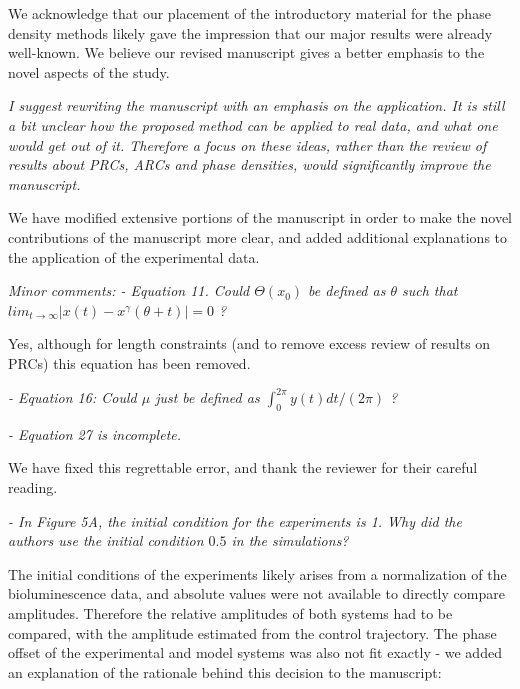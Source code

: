 \documentclass[11pt, letterpaper]{article}
\newenvironment{reviewer}{\itshape\color{gray}}{}
\begin{document}
We acknowledge that our placement of the introductory material for the phase density methods likely gave the impression that our major results were already well-known.
We believe our revised manuscript gives a better emphasis to the novel aspects of the study.

\begin{reviewer}
I suggest rewriting the manuscript with an emphasis on the application.
It is still a bit unclear how the proposed method can be applied to real data, and what one would get out of it.
Therefore a focus on these ideas, rather than the review of results about PRCs, ARCs and phase densities, would significantly improve the manuscript.
\end{reviewer}
 
We have modified extensive portions of the manuscript in order to make the novel contributions of the manuscript more clear, and added additional explanations to the application of the experimental data.

\begin{reviewer}
Minor comments: 
- Equation 11. Could $\Theta(x_0)$ be defined as $\theta$ such that $lim_{t\rightarrow \infty} | x(t)-x^\gamma(\theta+t)|=0$ ?
\end{reviewer}

Yes, although for length constraints (and to remove excess review of results on PRCs) this equation has been removed.

\begin{reviewer}
- Equation 16: Could $\mu$ just be defined as $\int_0^{2\pi} y(t)dt/(2\pi)$ ?
\end{reviewer}

\begin{reviewer}
- Equation 27 is incomplete. 
\end{reviewer}
 
We have fixed this regrettable error, and thank the reviewer for their careful reading.

\begin{reviewer}
- In Figure 5A, the initial condition for the experiments is 1. Why did the authors use the initial condition $0.5$ in the simulations?
\end{reviewer}

The initial conditions of the experiments likely arises from a normalization of the bioluminescence data, and absolute values were not available to directly compare amplitudes.
Therefore the relative amplitudes of both systems had to be compared, with the amplitude estimated from the control trajectory.
The phase offset of the experimental and model systems was also not fit exactly - we added an explanation of the rationale behind this decision to the manuscript:
\end{document}
